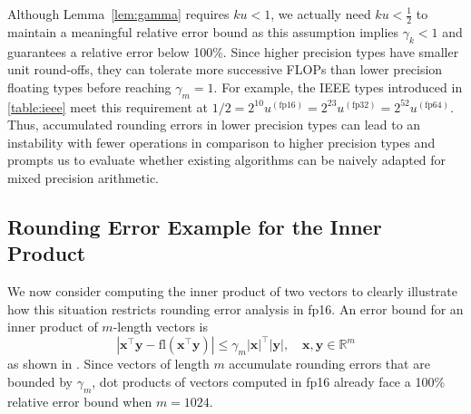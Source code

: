 \documentclass[review,onefignum,onetabnum]{siamart190516}
\newcommand{\R}{\mathbb{R}}
\newcommand{\bb}[1]{\mathbf{#1}}
\newcommand{\fl}{\mathrm{fl}}
\begin{document}
Although Lemma~\ref{lem:gamma} requires $ku<1$, we actually need $ku <\frac{1}{2}$ to maintain a meaningful relative error bound as this assumption implies $\gamma_k < 1$ and guarantees a relative error below 100\%. 
Since higher precision types have smaller unit round-offs, they can tolerate more successive FLOPs than lower precision floating types before reaching $\gamma_m=1$.
For example, the IEEE types introduced in \cref{table:ieee} meet this requirement at $1/2=2^{10}u^{(\text{fp16})}=2^{23}u^{(\text{fp32})}=2^{52}u^{(\text{fp64})}$.
Thus, accumulated rounding errors in lower precision types can lead to an instability with fewer operations in comparison to higher precision types and prompts us to evaluate whether existing algorithms can be naively adapted for mixed precision arithmetic.
\subsection{Rounding Error Example for the Inner Product}\label{sec:backgroundIP}
We now consider computing the inner product of two vectors to clearly illustrate how this situation restricts rounding error analysis in fp16. 
An error bound for an inner product of $m$-length vectors is
\begin{equation}
|\bb{x}^{\top}\bb{y} - \fl(\bb{x}^{\top}\bb{y})| \leq \gamma_{m} |\bb{x}|^{\top}|\bb{y}|, \quad \bb{x},\bb{y}\in\R^{m} \label{eqn:DDerr}
\end{equation}
as shown in \cite{Higham2002}.
Since vectors of length $m$ accumulate rounding errors that are bounded by $\gamma_{m}$, dot products of vectors computed in fp16 already face a 100\% relative error bound when $m=1024$. \par
\end{document}
